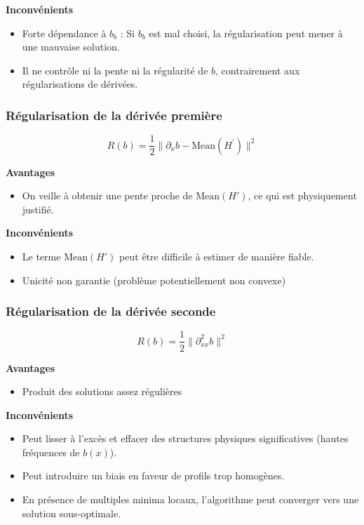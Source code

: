 \documentclass{article}
\begin{document}
\textbf{Inconvénients}
\begin{itemize}

        \item Forte dépendance à $b_b$ : Si $b_b$ est mal choisi, la régularisation peut mener à une mauvaise solution.
        \item Il ne contrôle ni la pente ni la régularité de $b$, contrairement aux régularisations de dérivées.
\end{itemize}

\subsubsection{Régularisation de la dérivée première}
\begin{equation}
R(b) = \frac{1}{2}\|\partial_x b - \text{Mean}(H^{\prime})\|^2
\end{equation}

\textbf{Avantages}
\begin{itemize}
\item On veille à obtenir une pente proche de \( \text{Mean}(H') \), ce qui est physiquement justifié.

\end{itemize}

\textbf{Inconvénients}
\begin{itemize}
    \item Le terme $\text{Mean}(H')$ peut être difficile à estimer de manière fiable.
\item Unicité non garantie (problème potentiellement non convexe)
\end{itemize}

\subsubsection{Régularisation de la dérivée seconde} 
\begin{equation}
R(b) = \frac{1}{2}\|\partial_{xx}^2 b\|^2
\end{equation}

\textbf{Avantages}
\begin{itemize}
\item Produit des solutions assez régulières


\end{itemize}

\textbf{Inconvénients}
\begin{itemize}
    \item Peut lisser à l’excès et effacer des structures physiques significatives (hautes fréquences de $b(x)$).
    \item Peut introduire un biais en faveur de profils trop homogènes.

    \item En présence de multiples minima locaux, l'algorithme peut converger vers une solution sous-optimale.
\end{itemize}
\end{document}

